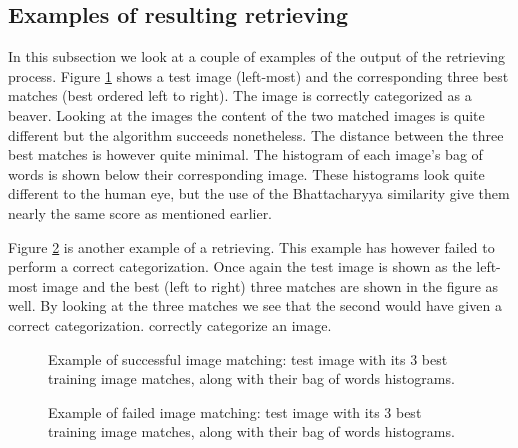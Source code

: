 \documentclass[11pt,a4paper]{article}
\begin{document}
\subsection{Examples of resulting retrieving}
In this subsection we look at a couple of examples of the output of the
retrieving process. Figure \ref{fig:results_11} shows a test image (left-most)
and the corresponding three best matches (best ordered left to right). The
image is correctly categorized as a beaver. Looking at the images the content
of the two matched images is quite different but the algorithm succeeds
nonetheless. The distance between the three best matches is however quite
minimal. The histogram of each image's bag of words is shown below their
corresponding image. These histograms look quite different to the human eye, but the use of the
Bhattacharyya similarity give them nearly the same score as mentioned earlier.

Figure \ref{fig:results_18} is another example of a retrieving. This example has
however failed to perform a correct categorization. Once again the test image is
shown as the left-most image and the best (left to right) three matches are
shown in the figure as well. By looking at the three matches we see that the
second would have given a correct categorization.
correctly categorize an image.
\begin{figure}[H]
\centering
{}
\caption{Example of successful image matching: test image with its 3 best
    training image matches, along with their bag of words histograms.}
\label{fig:results_11}
\end{figure}
%
\begin{figure}[H]
\centering
{}
\caption{Example of failed image matching: test image with its 3 best training
    image matches, along with their bag of words histograms.}
\label{fig:results_18}
\end{figure}
%
\end{document}
